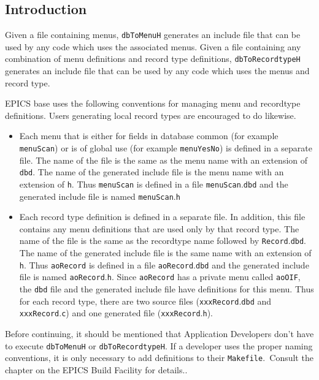 \subsection{Introduction}

Given a file containing menus, \verb|dbToMenuH| generates an include file that can be used by any code which uses the 
associated menus. Given a file containing any combination of menu definitions and record type definitions, 
\verb|dbToRecordtypeH| generates an include file that can be used by any code which uses the menus and record type.

EPICS base uses the following conventions for managing menu and recordtype definitions. Users generating local record 
types are encouraged to do likewise.

\begin{itemize}\item Each menu that is either for fields in database common (for example \verb|menuScan|) or is of global use (for example 
\verb|menuYesNo|) is defined in a separate file. The name of the file is the same as the menu name with an extension of 
\verb|dbd|. The name of the generated include file is the menu name with an extension of \verb|h|. Thus \verb|menuScan| is defined 
in a file \verb|menuScan|.\verb|dbd| and the generated include file is named \verb|menuScan|.\verb|h|

\item Each record type definition is defined in a separate file. In addition, this file contains any menu definitions that are 
used only by that record type. The name of the file is the same as the recordtype name followed by \verb|Record|.\verb|dbd|. 
The name of the generated include file is the same name with an extension of \verb|h|. Thus \verb|aoRecord| is defined in a 
file \verb|aoRecord|.\verb|dbd| and the generated include file is named \verb|aoRecord|.\verb|h|. Since \verb|aoRecord| has a private menu 
called \verb|aoOIF|, the \verb|dbd| file and the generated include file have definitions for this menu. Thus for each record type, 
there are two source files (\verb|xxxRecord|.\verb|dbd| and \verb|xxxRecord|.\verb|c|) and one generated file (\verb|xxxRecord|.\verb|h|). 

\end{itemize}Before continuing, it should be mentioned that Application Developers don't have to execute \verb|dbToMenuH| or 
\verb|dbToRecordtypeH|. If a developer uses the proper naming conventions, it is only necessary to add definitions to their 
\verb|Makefile|.\verb| |Consult the chapter on the EPICS Build Facility for details..

